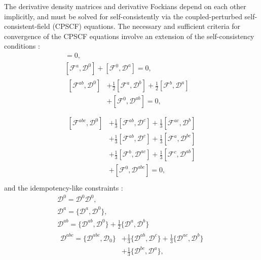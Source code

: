\documentclass[prl,aps,letterpaper,twocolumn,showpacs,twocolumngrid,superbib]{revtex4}
\def\F{\mathcal{F}}
\def\D{\mathcal{D}}
\begin{document}
The derivative density matrices and derivative Fockians depend on 
each other implicitly, and must be solved for self-consistently
via the coupled-perturbed self-consistent-field (CPSCF) equations.
The necessary and sufficient criteria for convergence of the 
CPSCF equations involve an extension of the self-consistency conditions \cite{Furche_2001}:
\begin{gather}
    [\F^{0} ,\D^{0}]=0,\label{eq:commutators1}\\
    [\F^{a} ,\D^{0}]+[\F^{0},\D^{a}]=0,\label{eq:commutators2}\\
  \begin{split}
    [\F^{ab},\D^{0}]&+\frac{1}{2}[\F^{a},\D^{b}]+\frac{1}{2}[\F^{b},\D^{a}] \\
    &+[\F^{0},\D^{ab}]=0,\label{eq:commutators3}\\
  \end{split}\\
  \begin{split}
    [\F^{abc},\D^{0}]&+\frac{1}{3}[\F^{ab},\D^{c}]+\frac{1}{3}[\F^{ac},\D^{b}]\\
    &+\frac{1}{3}[\F^{ab},\D^{c}]+\frac{1}{3}[\F^{a},\D^{bc}]\\
    &+\frac{1}{3}[\F^{b},\D^{ac}]+\frac{1}{3}[\F^{c},\D^{ab}]\\
    &+[\F^{0},\D^{abc}]=0,\label{eq:commutators4}\\
  \end{split}
\end{gather}
and the idempotency-like constraints \cite{Furche_2001}:
\begin{gather}
  \D^{0} =\D^{0} \D^{0},\label{eq:anticommutators1}\\
  \D^{a} =\{\D^{a},\D^{0}\},\label{eq:anticommutators2}\\
  \D^{ab}=\{\D^{ab},\D^{0}\}+\frac{1}{2}\{\D^{a},\D^{b}\}\label{eq:anticommutators3}\\
  \begin{split}
    \D^{abc}=\{\D^{abc},\D_0\}&+\frac{1}{3}\{\D^{ab},\D^{c}\}+\frac{1}{3}\{\D^{ac},\D^{b}\}\\
    &+\frac{1}{3}\{\D^{bc},\D^{a}\}\label{eq:anticommutators4},
  \end{split}
\end{gather}
\end{document}
